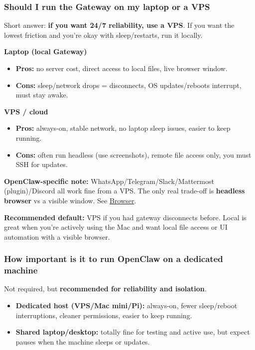 \subsubsection{Should I run the Gateway on my laptop or a VPS}


Short answer: \textbf{if you want 24/7 reliability, use a VPS}. If you want the
lowest friction and you're okay with sleep/restarts, run it locally.

\textbf{Laptop (local Gateway)}

\begin{itemize}
  \item \textbf{Pros:} no server cost, direct access to local files, live browser window.
  \item \textbf{Cons:} sleep/network drops = disconnects, OS updates/reboots interrupt, must stay awake.
\end{itemize}


\textbf{VPS / cloud}

\begin{itemize}
  \item \textbf{Pros:} always-on, stable network, no laptop sleep issues, easier to keep running.
  \item \textbf{Cons:} often run headless (use screenshots), remote file access only, you must SSH for updates.
\end{itemize}


\textbf{OpenClaw-specific note:} WhatsApp/Telegram/Slack/Mattermost (plugin)/Discord all work fine from a VPS. The only real trade-off is \textbf{headless browser} vs a visible window. See \href{/tools/browser}{Browser}.

\textbf{Recommended default:} VPS if you had gateway disconnects before. Local is great when you're actively using the Mac and want local file access or UI automation with a visible browser.

\subsubsection{How important is it to run OpenClaw on a dedicated machine}


Not required, but \textbf{recommended for reliability and isolation}.

\begin{itemize}
  \item \textbf{Dedicated host (VPS/Mac mini/Pi):} always-on, fewer sleep/reboot interruptions, cleaner permissions, easier to keep running.
  \item \textbf{Shared laptop/desktop:} totally fine for testing and active use, but expect pauses when the machine sleeps or updates.
\end{itemize}


